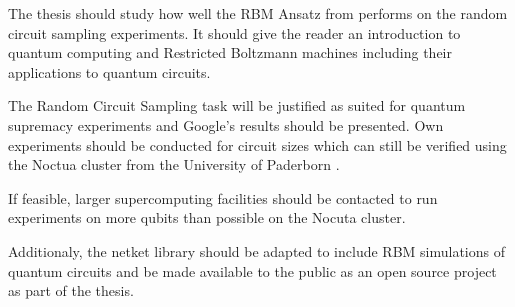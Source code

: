 The thesis should study how well the RBM Ansatz from \cite{jnsson2018neuralnetwork} performs on 
the random circuit sampling experiments. It should give the reader an introduction to 
quantum computing and Restricted Boltzmann machines including their applications to quantum circuits.

The Random Circuit Sampling task will be justified as suited for quantum supremacy experiments and 
Google's results should be presented. Own experiments should be conducted for circuit sizes which
can still be verified using the Noctua cluster from the University of Paderborn \cite{noctua2020}.

If feasible, larger supercomputing facilities should be 
contacted to run experiments on more qubits than possible on the Nocuta cluster.

Additionaly, the netket library \cite{netket:2019} should be adapted to include RBM simulations of quantum circuits and be 
made available to the public as an open source project as part of the thesis.